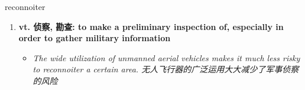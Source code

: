 
\begin{frame}
{\huge reconnoiter}
\begin{center}
\begin{enumerate}\Large
  \item \textbf{vt. 侦察, 勘查: to make a preliminary inspection of, especially in order to gather military information}
  \begin{itemize}
    \item \em{\Large{The wide utilization of unmanned aerial vehicles makes it much less risky to reconnoiter a certain area. 无人飞行器的广泛运用大大减少了军事侦察的风险}}
  \end{itemize}
\end{enumerate}
\end{center}
\end{frame}
